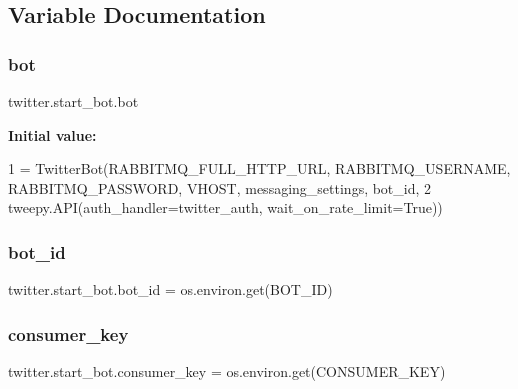 \subsection{Variable Documentation}
\mbox{\label{namespacetwitter_1_1start__bot_a2a483e905414b191f63295a1c4e72341}} 
\subsubsection{\texorpdfstring{bot}{bot}}
{\footnotesize\ttfamily twitter.\+start\+\_\+bot.\+bot}

{\bfseries Initial value\+:}
\begin{DoxyCode}
1 =  TwitterBot(RABBITMQ\_FULL\_HTTP\_URL, RABBITMQ\_USERNAME, RABBITMQ\_PASSWORD, VHOST, messaging\_settings, 
      bot\_id,
2                      tweepy.API(auth\_handler=twitter\_auth, wait\_on\_rate\_limit=\textcolor{keyword}{True}))
\end{DoxyCode}
\mbox{\label{namespacetwitter_1_1start__bot_a39c87df420e6fd56ed192fc038cea853}} 
\subsubsection{\texorpdfstring{bot\+\_\+id}{bot\_id}}
{\footnotesize\ttfamily twitter.\+start\+\_\+bot.\+bot\+\_\+id = os.\+environ.\+get(\textquotesingle{}B\+O\+T\+\_\+\+ID\textquotesingle{})}

\mbox{\label{namespacetwitter_1_1start__bot_a6ee394450a1b57a8da97f52925f8a98e}} 
\subsubsection{\texorpdfstring{consumer\+\_\+key}{consumer\_key}}
{\footnotesize\ttfamily twitter.\+start\+\_\+bot.\+consumer\+\_\+key = os.\+environ.\+get(\textquotesingle{}C\+O\+N\+S\+U\+M\+E\+R\+\_\+\+K\+EY\textquotesingle{})}

